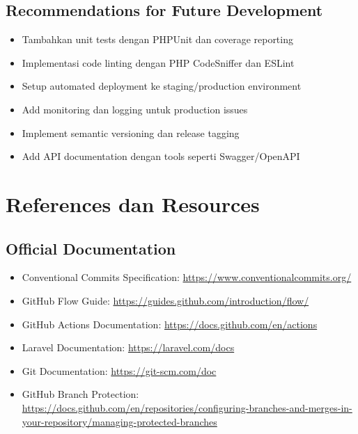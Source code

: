 \documentclass[a4paper,oneside,11pt]{book}
\begin{document}
\section{Recommendations for Future Development}

\begin{itemize}
    \item Tambahkan unit tests dengan PHPUnit dan coverage reporting
    \item Implementasi code linting dengan PHP CodeSniffer dan ESLint
    \item Setup automated deployment ke staging/production environment
    \item Add monitoring dan logging untuk production issues
    \item Implement semantic versioning dan release tagging
    \item Add API documentation dengan tools seperti Swagger/OpenAPI
\end{itemize}

\newpage


\appendix

\chapter{References dan Resources}

\section{Official Documentation}

\begin{itemize}
    \item Conventional Commits Specification: \url{https://www.conventionalcommits.org/}
    \item GitHub Flow Guide: \url{https://guides.github.com/introduction/flow/}
    \item GitHub Actions Documentation: \url{https://docs.github.com/en/actions}
    \item Laravel Documentation: \url{https://laravel.com/docs}
    \item Git Documentation: \url{https://git-scm.com/doc}
    \item GitHub Branch Protection: \url{https://docs.github.com/en/repositories/configuring-branches-and-merges-in-your-repository/managing-protected-branches}
\end{itemize}
\end{document}
